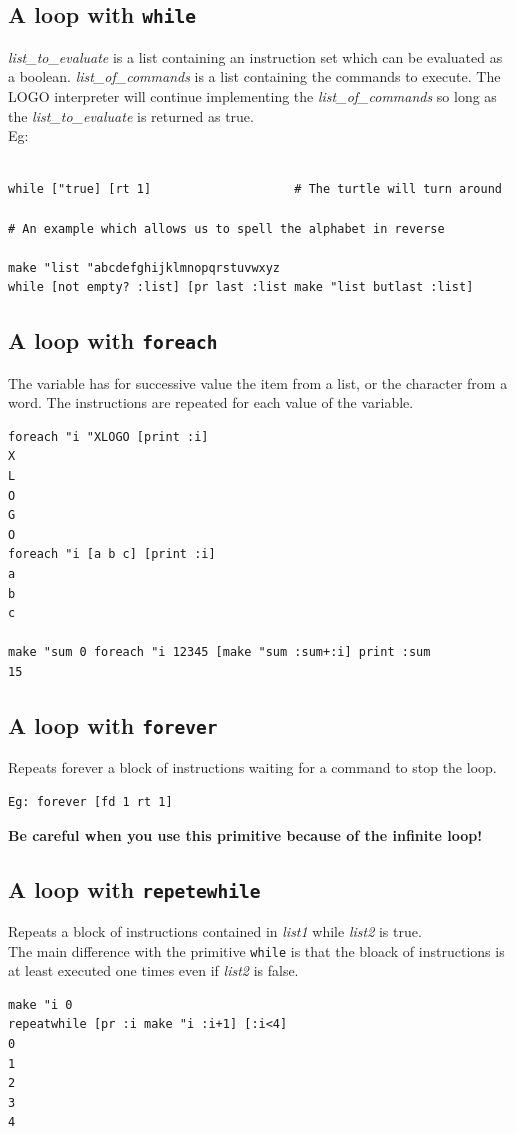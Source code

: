 \subsection{A loop with \texttt{while}}
\noindent {}
\textit{list\_to\_evaluate} is a list containing an instruction set
which can be evaluated as a boolean. \textit{list\_of\_commands} is
a list containing the commands to execute. The LOGO interpreter will
continue implementing the \textit{list\_of\_commands} so long as the
\textit{list\_to\_evaluate} is returned as true.\\
 Eg: \begin{verbatim}

while ["true] [rt 1]                    # The turtle will turn around

# An example which allows us to spell the alphabet in reverse

make "list "abcdefghijklmnopqrstuvwxyz
while [not empty? :list] [pr last :list make "list butlast :list]
\end{verbatim}
\subsection{A loop with \texttt{foreach}}
\noindent {}
The variable has for successive value the item from a list, or the character from a word. The instructions are repeated for each value of the variable.
\begin{verbatim}
foreach "i "XLOGO [print :i]
X
L
O
G
O
foreach "i [a b c] [print :i]
a
b
c

make "sum 0 foreach "i 12345 [make "sum :sum+:i] print :sum
15
\end{verbatim}

\subsection{A loop with \texttt{forever}}
\noindent {}
Repeats forever a block of instructions waiting for a command to stop the loop. \\
\begin{verbatim}
Eg: forever [fd 1 rt 1]
\end{verbatim}
\textbf{Be careful when you use this primitive because of the infinite loop!}\\
\subsection{A loop with \texttt{repetewhile}}
\noindent {}
Repeats a block of instructions contained in \textit{list1} while \textit{list2} is true.\\
The main difference with the primitive \texttt{while} is that the bloack of instructions is at least executed one times even if \textit{list2} is false.
\begin{verbatim}
make "i 0
repeatwhile [pr :i make "i :i+1] [:i<4]
0
1
2
3
4
\end{verbatim}
